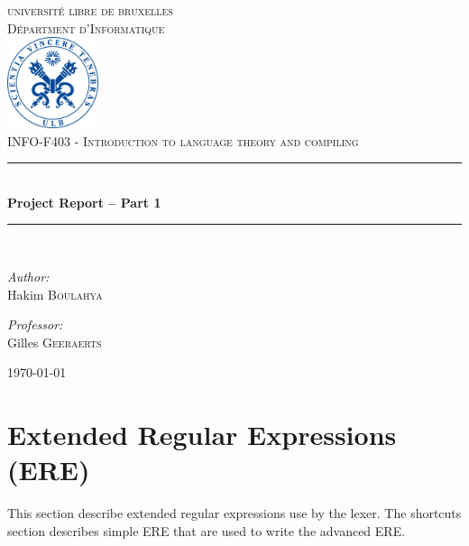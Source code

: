\documentclass[letterpaper]{article}
\newcommand{\HRule}{\rule{\linewidth}{0.5mm}} %
\begin{document}
\begin{titlepage}
\begin{center}


\textsc{\LARGE universit\'e libre de bruxelles}\\[1.0cm]
\textsc{\Large D\'epartment d'Informatique}\\[1.5cm]

\includegraphics[width=0.2\textwidth]{image/ulblogo.jpg}~\\[1cm]

\textsc{\Large INFO-F403 - Introduction to language theory and compiling
\\[0.3cm]}
\HRule \\[0.4cm]
{ \huge \bfseries Project Report – Part 1  \\[0.4cm] }

\HRule \\[1.5cm]

\noindent
\begin{center} \large

\emph{Author:}\\
Hakim \textsc{Boulahya}\\
\end{center}
\begin{center} \large

\emph{Professor:} \\
Gilles \textsc{Geeraerts}\\

\end{center}

\vfill

{\large \today}

\end{center}
\end{titlepage}

\tableofcontents
\newpage


\section{Extended Regular Expressions (ERE)}
This section describe extended regular expressions use by the lexer.
The shortcuts section describes simple ERE that are used to write
the advanced ERE.
\end{document}
